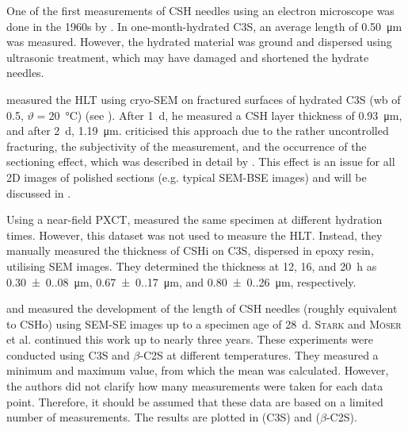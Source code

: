 One of the first measurements of \ac{CSH} needles using an electron microscope was done in the 1960s by \textcite{kurczyk.1960}.
In one-month-hydrated \ac{C3S}, an average length of \qty{0.50}{\micro\meter} was measured.
However, the hydrated material was ground and dispersed using ultrasonic treatment, which may have damaged and shortened the hydrate needles.

\textcite{nicoleau.2011} measured the \ac{HLT} using cryo-\ac{SEM} on fractured surfaces of hydrated \ac{C3S} (\ac{wb} of \num{0.5}, $\vartheta=$\qty{20}{\celsius}) (see ).
After \qty{1}{\day}, he measured a \ac{CSH} layer thickness of \qty{0.93}{\micro\meter}, and after \qty{2}{\day}, \qty{1.19}{\micro\meter}.
\textcite{bishnoi.2012} criticised this approach due to the rather uncontrolled fracturing, the subjectivity of the measurement, and the occurrence of the sectioning effect, which was described in detail by \textcite{scrivener.2004}.
This effect is an issue for all 2D images of polished sections (e.g. typical \ac{SEM}-\ac{BSE} images) and will be discussed in .

Using a near-field \ac{PXCT}, \textcite{neubauer.2022} measured the same specimen at different hydration times.
However, this dataset \cite{neubauer.2025} was not used to measure the \ac{HLT}.
Instead, they manually measured the thickness of \ac{CSHi} on \ac{C3S}, dispersed in epoxy resin, utilising \ac{SEM} images.
They determined the thickness at \num{12}, \num{16}, and \qty{20}{\hour} as \qty{0.30(0.08)}{\micro\meter}, \qty{0.67(0.17)}{\micro\meter}, and \qty{0.80(0.26)}{\micro\meter}, respectively.

\textcite{voland.2000} and \textcite{suess.2001} measured the development of the length of \ac{CSH} needles (roughly equivalent to \ac{CSHo}) using \ac{SEM}-\ac{SE} images up to a specimen age of \qty{28}{\day}.
\textsc{Stark} and \textsc{Möser} et al. \cite{stark.2001,moser.2001,moser.2002} continued this work up to nearly three years.
These experiments were conducted using \ac{C3S} and $\beta$-\ac{C2S} at different temperatures.
They measured a minimum and maximum value, from which the mean was calculated.
However, the authors did not clarify how many measurements were taken for each data point.
Therefore, it should be assumed that these data are based on a limited number of measurements.
The results are plotted in  (\ac{C3S}) and  ($\beta$-\ac{C2S}).

